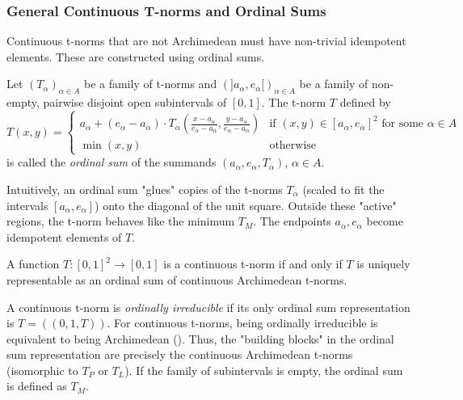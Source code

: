 \subsubsection{General Continuous T-norms and Ordinal Sums}
Continuous t-norms that are not Archimedean must have non-trivial idempotent elements. These are constructed using ordinal sums.
\begin{definition}
Let $(T_\alpha)_{\alpha \in A}$ be a family of t-norms and $(]a_\alpha, e_\alpha[)_{\alpha \in A}$ be a family of non-empty, pairwise disjoint open subintervals of $[0,1]$. The t-norm $T$ defined by
\[
T(x,y) =
\begin{cases}
  a_\alpha + (e_\alpha - a_\alpha) \cdot T_\alpha \left( \frac{x-a_\alpha}{e_\alpha - a_\alpha}, \frac{y-a_\alpha}{e_\alpha - a_\alpha} \right) & \text{if } (x,y) \in [a_\alpha, e_\alpha]^2 \text{ for some } \alpha \in A \\
  \min(x,y) & \text{otherwise}
\end{cases}
\]
is called the \emph{ordinal sum} of the summands $(a_\alpha, e_\alpha, T_\alpha)$, $\alpha \in A$.
\end{definition}
Intuitively, an ordinal sum "glues" copies of the t-norms $T_\alpha$ (scaled to fit the intervals $[a_\alpha, e_\alpha]$) onto the diagonal of the unit square. Outside these "active" regions, the t-norm behaves like the minimum $T_M$. The endpoints $a_\alpha, e_\alpha$ become idempotent elements of $T$.

\begin{theorem}
  A function $T: [0,1]^2 \to [0,1]$ is a continuous t-norm if and only if $T$ is uniquely representable as an ordinal sum of continuous Archimedean t-norms.
\end{theorem}
\begin{remark}
  A continuous t-norm is \emph{ordinally irreducible} if its only ordinal sum representation is $T = ((0,1,T))$. For continuous t-norms, being ordinally irreducible is equivalent to being Archimedean (\cite[Prop.~3.53, p.~99 and context]{Klement2000}). Thus, the "building blocks" in the ordinal sum representation are precisely the continuous Archimedean t-norms (isomorphic to $T_P$ or $T_L$). If the family of subintervals is empty, the ordinal sum is defined as $T_M$.
\end{remark}

